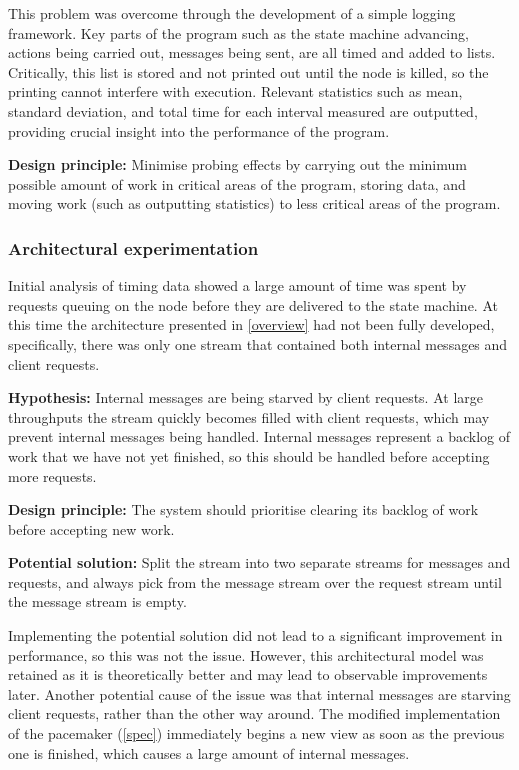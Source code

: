 This problem was overcome through the development of a simple logging framework. Key parts of the program such as the state machine advancing, actions being carried out, messages being sent, are all timed and added to lists. Critically, this list is stored and not printed out until the node is killed, so the printing cannot interfere with execution. Relevant statistics such as mean, standard deviation, and total time for each interval measured are outputted, providing crucial insight into the performance of the program.

\textbf{Design principle: } Minimise probing effects by carrying out the minimum possible amount of work in critical areas of the program, storing data, and moving work (such as outputting statistics) to less critical areas of the program.

\subsubsection{Architectural experimentation}
Initial analysis of timing data showed a large amount of time was spent by requests queuing on the node before they are delivered to the state machine. At this time the architecture presented in \ref{overview} had not been fully developed, specifically, there was only one stream that contained both internal messages and client requests.

\textbf{Hypothesis: } Internal messages are being starved by client requests. At large throughputs the stream quickly becomes filled with client requests, which may prevent internal messages being handled. Internal messages represent a backlog of work that we have not yet finished, so this should be handled before accepting more requests.

\textbf{Design principle: } The system should prioritise clearing its backlog of work before accepting new work.

\textbf{Potential solution: } Split the stream into two separate streams for messages and requests, and always pick from the message stream over the request stream until the message stream is empty.

Implementing the potential solution did not lead to a significant improvement in performance, so this was not the issue. However, this architectural model was retained as it is theoretically better and may lead to observable improvements later. Another potential cause of the issue was that internal messages are starving client requests, rather than the other way around. The modified implementation of the pacemaker (\ref{spec}) immediately begins a new view as soon as the previous one is finished, which causes a large amount of internal messages.

